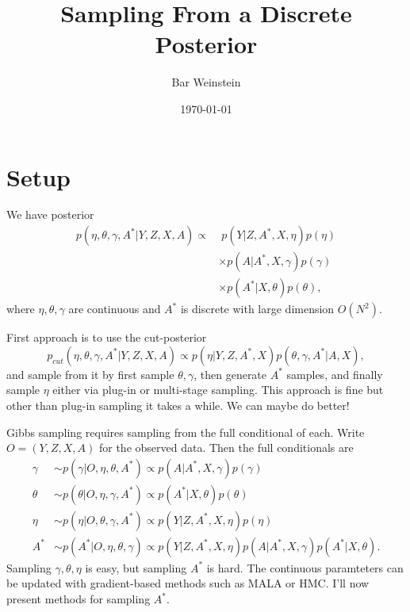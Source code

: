 \documentclass[12pt]{article}
\title{Sampling From a Discrete Posterior}
\author{Bar Weinstein}
\date{\today}
\begin{document}
\maketitle

\section{Setup}
We have posterior 
\begin{equation}
\label{eq:observed.posterior}
\begin{split}
  p(\eta,\theta,\gamma, A^\ast \vert Y,Z,X,A) 
    \propto
    &\; p(Y \vert Z,A^\ast,X,\eta) p(\eta) 
    \\ & 
  \times p(A \vert A^\ast, X,\gamma) 
   p(\gamma)
    \\ &
   \times p(A^\ast \vert X,\theta) 
   p(\theta),
\end{split}
\end{equation}
where $\eta,\theta,\gamma$ are continuous and $A^\ast$ is
discrete with large dimension $O(N^2)$. 

First approach is to use the cut-posterior 
\begin{equation}
    \label{eq:cut.posterior}
    p_{cut}(\eta,\theta,\gamma,A^\ast \vert Y,Z,X,A) \propto 
    p(\eta \vert Y,Z, A^\ast,X)
    p(\theta,\gamma,A^\ast \vert A, X),
\end{equation}
and sample from it by first sample $\theta,\gamma$, 
then generate $A^\ast$ samples,
and finally sample $\eta$ either via plug-in or multi-stage sampling.
This approach is fine but other than plug-in sampling it takes a while.
We can maybe do better!

Gibbs sampling requires sampling from the full conditional of each.
 Write $O = (Y,Z,X,A)$ for the observed data.
Then the full conditionals are
\begin{equation}
    \label{eq:full.conditionals}
    \begin{split}
     \gamma  &\sim p(\gamma \vert O, \eta,\theta,A^\ast) \propto 
        p(A \vert A^\ast, X,\gamma) p(\gamma) \\
    \theta &\sim p(\theta \vert O, \eta,\gamma,A^\ast) \propto
        p(A^\ast \vert X,\theta) p(\theta) \\
    \eta &\sim p(\eta \vert O, \theta,\gamma,A^\ast) \propto
        p(Y \vert Z,A^\ast,X,\eta) p(\eta) \\
    A^\ast &\sim p(A^\ast \vert O, \eta,\theta,\gamma) \propto
        p(Y \vert Z,A^\ast,X,\eta) p(A \vert A^\ast, X,\gamma) p(A^\ast \vert X,\theta).
    \end{split}
\end{equation}
Sampling $\gamma,\theta,\eta$ is easy, but sampling $A^\ast$ is hard.
The continuous paramteters can be updated with gradient-based methods such as 
MALA or HMC. I'll now present methods for sampling $A^\ast$.
\end{document}
